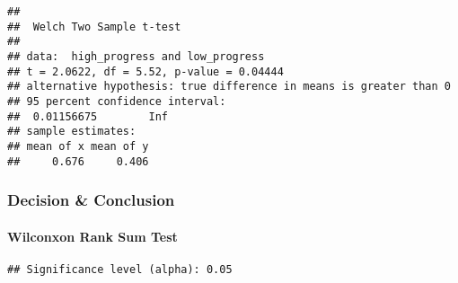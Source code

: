 \documentclass[
]{article}
\newenvironment{Shaded}{\begin{snugshade}}{\end{snugshade}}
\newcommand{\ControlFlowTok}[1]{\textcolor[rgb]{0.13,0.29,0.53}{\textbf{#1}}}
\newcommand{\FloatTok}[1]{\textcolor[rgb]{0.00,0.00,0.81}{#1}}
\newcommand{\FunctionTok}[1]{\textcolor[rgb]{0.00,0.00,0.00}{#1}}
\newcommand{\NormalTok}[1]{#1}
\newcommand{\OtherTok}[1]{\textcolor[rgb]{0.56,0.35,0.01}{#1}}
\newcommand{\SpecialCharTok}[1]{\textcolor[rgb]{0.00,0.00,0.00}{#1}}
\newcommand{\StringTok}[1]{\textcolor[rgb]{0.31,0.60,0.02}{#1}}
\begin{document}
\begin{verbatim}
## 
##  Welch Two Sample t-test
## 
## data:  high_progress and low_progress
## t = 2.0622, df = 5.52, p-value = 0.04444
## alternative hypothesis: true difference in means is greater than 0
## 95 percent confidence interval:
##  0.01156675        Inf
## sample estimates:
## mean of x mean of y 
##     0.676     0.406
\end{verbatim}

\hypertarget{decision-conclusion-1}{%
\subsubsection{Decision \& Conclusion}\label{decision-conclusion-1}}

\hypertarget{wilconxon-rank-sum-test}{%
\paragraph{Wilconxon Rank Sum Test}\label{wilconxon-rank-sum-test}}

\begin{Shaded}
\end{Shaded}

\begin{verbatim}
## Significance level (alpha): 0.05
\end{verbatim}

\begin{Shaded}
\end{Shaded}
\end{document}
